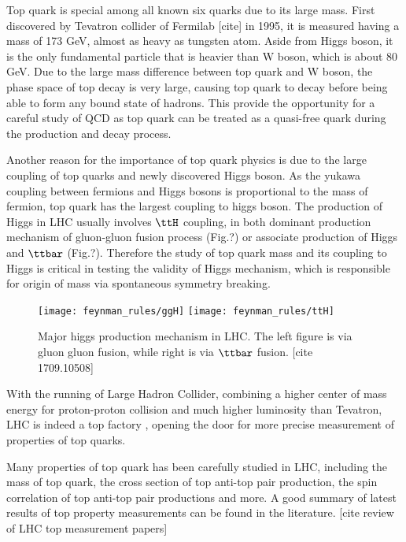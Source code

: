 \clearpage

Top quark is special among all known six quarks due to its large mass. First discovered by Tevatron collider of Fermilab [cite] in 1995, it is measured having a mass of 173 GeV, almost as heavy as tungsten atom. Aside from Higgs boson, it is the only fundamental particle that is heavier than W boson, which is about 80 GeV. Due to the large mass difference between top quark and W boson, the phase space of top decay is very large, causing top quark to decay before being able to form any bound state of hadrons. This provide the opportunity for a careful study of QCD as top quark can be treated as a quasi-free quark during the production and decay process.

Another reason for the importance of top quark physics is due to the large coupling of top quarks and newly discovered Higgs boson. As the yukawa coupling between fermions and Higgs bosons is proportional to the mass of fermion, top quark has the largest coupling to higgs boson. The production of Higgs in LHC usually involves $\ttH$ coupling, in both dominant production mechanism of gluon-gluon fusion process (Fig.?) or associate production of Higgs and $\ttbar$ (Fig.?). Therefore the study of top quark mass and its coupling to Higgs is critical in testing the validity of Higgs mechanism, which is responsible for origin of mass via spontaneous symmetry breaking. 

\begin{figure}[hbt]
	\begin{center}
		\texttt{[image: feynman\_rules/ggH]}
		\texttt{[image: feynman\_rules/ttH]}
		\caption{\small Major higgs production mechanism in LHC. The left figure is via gluon gluon fusion, while right is via $\ttbar$ fusion.  [cite 1709.10508] }
		\label{fig:ttg}
	\end{center}
\end{figure}


With the running of Large Hadron Collider, combining a higher center of mass energy for proton-proton collision and much higher luminosity than Tevatron, LHC is indeed a top factory , opening the door for more precise measurement of properties of top quarks.

Many properties of top quark has been carefully studied in LHC, including the mass of top quark, the cross section of top anti-top pair production, the spin correlation of top anti-top pair productions and more. A good summary of latest results of top property measurements can be found in the literature. [cite review of LHC top measurement papers] 

